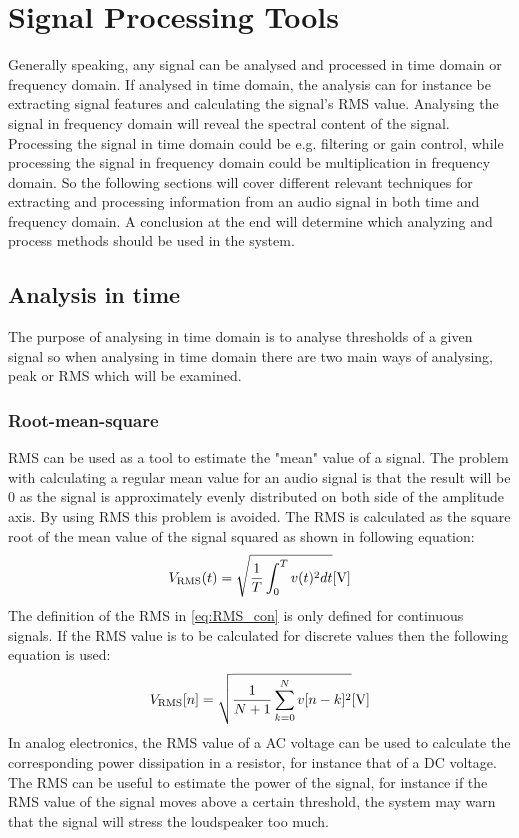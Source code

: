 \chapter{Signal Processing Tools}
Generally speaking, any signal can be analysed and processed in time domain or frequency domain. If analysed in time domain, the analysis can for instance be extracting signal features and calculating the signal's RMS value. Analysing the signal in frequency domain will reveal the spectral content of the signal. Processing the signal in time domain could be e.g. filtering or gain control, while processing the signal in frequency domain could be multiplication in frequency domain. So the following sections will cover different relevant techniques for extracting and processing information from an audio signal in both time and frequency domain. A conclusion at the end will determine which analyzing and process methods should be used in the system.

\section{Analysis in time} \label{sec:SignalTime}
The purpose of analysing in time domain is to analyse thresholds of a given signal so when analysing in time domain there are two main ways of analysing, peak or RMS which will be examined.
\subsection*{Root-mean-square}
RMS can be used as a tool to estimate the "mean" value of a signal. The problem with calculating a regular mean value for an audio signal is that the result will be 0 as the signal is approximately evenly distributed on both side of the amplitude axis. By using RMS this problem is avoided. The RMS is calculated as the square root of the mean value of the signal squared as shown in following equation:
\begin{equation}\label{eq:RMS_con}
V_{\text{RMS}}(t) = \sqrt{\frac{1}{T}\int_0^T v(t)^2 dt} \enhed{V}
\end{equation}
The definition of the RMS in \autoref{eq:RMS_con} is only defined for continuous signals. If the RMS value is to be calculated for discrete values then the following equation is used:
\begin{equation}
V_{\text{RMS}}[n] = \sqrt{\frac{1}{N+1}\sum_{k=0}^{N} v[n-k]^2} \enhed{V}
\end{equation}
In analog electronics, the RMS value of a AC voltage can be used to calculate the corresponding power dissipation in a resistor, for instance that of a DC voltage. The RMS can be useful to estimate the power of the signal, for instance if the RMS value of the signal moves above a certain threshold, the system may warn that the signal will stress the loudspeaker too much.

